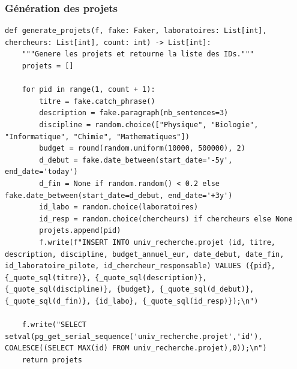 \documentclass[12pt,a4paper]{article}
\begin{document}
\subsubsection{Génération des projets}
\begin{lstlisting}[style=pythonstyle, caption=Exemple de génération des projets]
def generate_projets(f, fake: Faker, laboratoires: List[int], chercheurs: List[int], count: int) -> List[int]:
    """Genere les projets et retourne la liste des IDs."""
    projets = []
    
    for pid in range(1, count + 1):
        titre = fake.catch_phrase()
        description = fake.paragraph(nb_sentences=3)
        discipline = random.choice(["Physique", "Biologie", "Informatique", "Chimie", "Mathematiques"])
        budget = round(random.uniform(10000, 500000), 2)
        d_debut = fake.date_between(start_date='-5y', end_date='today')
        d_fin = None if random.random() < 0.2 else fake.date_between(start_date=d_debut, end_date='+3y')
        id_labo = random.choice(laboratoires)
        id_resp = random.choice(chercheurs) if chercheurs else None
        projets.append(pid)
        f.write(f"INSERT INTO univ_recherche.projet (id, titre, description, discipline, budget_annuel_eur, date_debut, date_fin, id_laboratoire_pilote, id_chercheur_responsable) VALUES ({pid}, {_quote_sql(titre)}, {_quote_sql(description)}, {_quote_sql(discipline)}, {budget}, {_quote_sql(d_debut)}, {_quote_sql(d_fin)}, {id_labo}, {_quote_sql(id_resp)});\n")
    
    f.write("SELECT setval(pg_get_serial_sequence('univ_recherche.projet','id'), COALESCE((SELECT MAX(id) FROM univ_recherche.projet),0));\n")
    return projets
\end{lstlisting}
\end{document}
